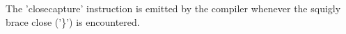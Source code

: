 The 'closecapture' instruction is emitted by the compiler
whenever the squigly brace close ('\}') is encountered.
